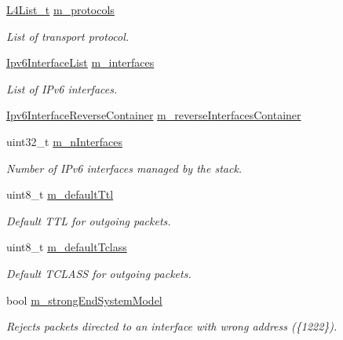 \begin{DoxyCompactItemize}
\hyperlink{classns3_1_1Ipv6L3Protocol_a081eeffb80d91d0702285b6bb5687082}{L4\+List\+\_\+t} \hyperlink{classns3_1_1Ipv6L3Protocol_a5a68c54b92d81f93c41983ebdc0ef5b3}{m\+\_\+protocols}
\begin{DoxyCompactList}\small\item\em List of transport protocol. \end{DoxyCompactList}\item 
\hyperlink{classns3_1_1Ipv6L3Protocol_a3324185c048c5bcd0a4511b8ebf166db}{Ipv6\+Interface\+List} \hyperlink{classns3_1_1Ipv6L3Protocol_a425d8738fd30fbc9345d57cfddd0d6d0}{m\+\_\+interfaces}
\begin{DoxyCompactList}\small\item\em List of I\+Pv6 interfaces. \end{DoxyCompactList}\item 
\hyperlink{classns3_1_1Ipv6L3Protocol_a1fb40e4ad1a4612f73c192418df88228}{Ipv6\+Interface\+Reverse\+Container} \hyperlink{classns3_1_1Ipv6L3Protocol_aba2395fbe747b5c8d0f46d65556eea0c}{m\+\_\+reverse\+Interfaces\+Container}
\item 
uint32\+\_\+t \hyperlink{classns3_1_1Ipv6L3Protocol_a61c0b45c983a905ebfe4ebce1a90a1d7}{m\+\_\+n\+Interfaces}
\begin{DoxyCompactList}\small\item\em Number of I\+Pv6 interfaces managed by the stack. \end{DoxyCompactList}\item 
uint8\+\_\+t \hyperlink{classns3_1_1Ipv6L3Protocol_a2857858d48a3ce4f6bc1912d721825b7}{m\+\_\+default\+Ttl}
\begin{DoxyCompactList}\small\item\em Default T\+TL for outgoing packets. \end{DoxyCompactList}\item 
uint8\+\_\+t \hyperlink{classns3_1_1Ipv6L3Protocol_a0ead80eb6fa685c54dc155dff9157345}{m\+\_\+default\+Tclass}
\begin{DoxyCompactList}\small\item\em Default T\+C\+L\+A\+SS for outgoing packets. \end{DoxyCompactList}\item 
bool \hyperlink{classns3_1_1Ipv6L3Protocol_ac00aee071bc7ab2096efbf8fdc5e3814}{m\+\_\+strong\+End\+System\+Model}
\begin{DoxyCompactList}\small\item\em Rejects packets directed to an interface with wrong address (\{1222\}). \end{DoxyCompactList}\item 

\end{DoxyCompactItemize}
